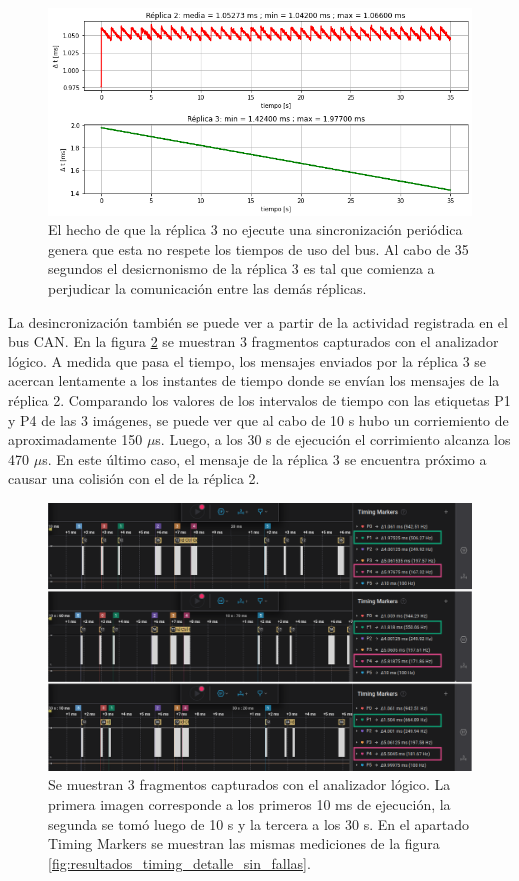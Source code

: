 \begin{figure}[H]
    \centering
    \includegraphics[width=\textwidth]{img/resultados_no_sync.png}
    \caption{El hecho de que la réplica 3 no ejecute una sincronización periódica genera que esta no respete los tiempos de uso del bus. Al cabo de 35 segundos el desicrnonismo de la réplica 3 es tal que comienza a perjudicar la comunicación entre las demás réplicas.}
    \label{fig:resultados_no_sync}
\end{figure}

La desincronización también se puede ver a partir de la actividad registrada en el bus CAN. En la figura \ref{fig:resultados_timing_detalle_placa_3_no_sync} se muestran 3 fragmentos capturados con el analizador lógico. A medida que pasa el tiempo, los mensajes enviados por la réplica 3 se acercan lentamente a los instantes de tiempo donde se envían los mensajes de la réplica 2. Comparando los valores de los intervalos de tiempo con las etiquetas P1 y P4 de las 3 imágenes, se puede ver que al cabo de 10 s hubo un corriemiento de aproximadamente 150 $\mu$s. Luego, a los 30 s de ejecución el corrimiento alcanza los 470 $\mu$s. En este último caso, el mensaje de la réplica 3 se encuentra próximo a causar una colisión con el de la réplica 2.

\begin{figure}[H]
    \centering
    \includegraphics[width=\textwidth]{img/resultados_timing_detalle_placa_3_no_sync.png}
    \caption{Se muestran 3 fragmentos capturados con el analizador lógico. La primera imagen corresponde a los primeros 10 ms de ejecución, la segunda se tomó luego de 10 s y la tercera a los 30 s. En el apartado Timing Markers se muestran las mismas mediciones de la figura \ref{fig:resultados_timing_detalle_sin_fallas}.}
    \label{fig:resultados_timing_detalle_placa_3_no_sync}
\end{figure}

